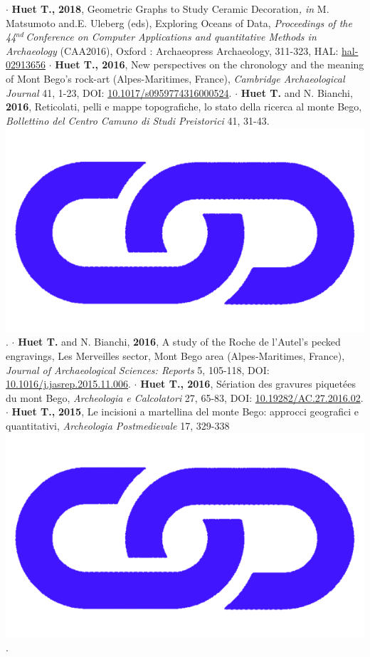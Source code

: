 \documentclass{article}
\begin{document}
\smallbreak
$\cdot$ \textbf{Huet T.,} \textbf{2018}, Geometric Graphs to Study Ceramic Decoration\textit{, in} M. Matsumoto and.E. Uleberg (eds), Exploring Oceans of Data, \textit{Proceedings of the 44${}^{nd\ }$Conference on Computer Applications and quantitative Methods in Archaeology} (CAA2016), Oxford : Archaeopress Archaeology, 311-323, HAL: \href{https://hal.archives-ouvertes.fr/hal-02913656}{hal-02913656}
\smallbreak
$\cdot$ \textbf{Huet T., 2016}, New perspectives on the chronology and the meaning of Mont Bego's rock-art (Alpes-Maritimes, France), \textit{Cambridge Archaeological Journal} 41, 1-23, DOI: \href{https://doi.org/10.1017/s0959774316000524}{10.1017/s0959774316000524}.
\smallbreak
$\cdot$ \textbf{Huet T.} and N. Bianchi, \textbf{2016}, Reticolati, pelli e mappe topografiche, lo stato della ricerca al monte Bego, \textit{Bollettino del Centro Camuno di Studi Preistorici} 41, 31-43. \href{https://www.researchgate.net/publication/358896027_Reticolati_pelli_e_mappe_topografiche}{\includegraphics[scale=0.02]{link_darkblue.png}}.
\smallbreak
$\cdot$ \textbf{Huet T.} and N. Bianchi, \textbf{2016}, A study of the Roche de l'Autel's pecked engravings, Les Merveilles sector, Mont Bego area (Alpes-Maritimes, France), \textit{Journal of Archaeological Sciences: Reports} 5, 105-118, DOI: \href{https://doi.org/10.1016/j.jasrep.2015.11.006}{10.1016/j.jasrep.2015.11.006}.
\smallbreak
$\cdot$ \textbf{Huet T., 2016}, S\'{e}riation des gravures piquet\'{e}es du mont Bego, \textit{Archeologia e Calcolatori} 27, 65-83, DOI: \href{https://doi.org/10.19282/AC.27.2016.02}{10.19282/AC.27.2016.02}.
\smallbreak
$\cdot$ \textbf{Huet T.,} \textbf{2015}, Le incisioni a martellina del monte Bego: approcci geografici e quantitativi, \textit{Archeologia Postmedievale} 17, 329-338 \href{https://www.insegnadelgiglio.it/wp-content/uploads/2015/01/APM_17_libro-anteprima.pdf}{\includegraphics[scale=0.02]{link_darkblue.png}}.
\end{document}
